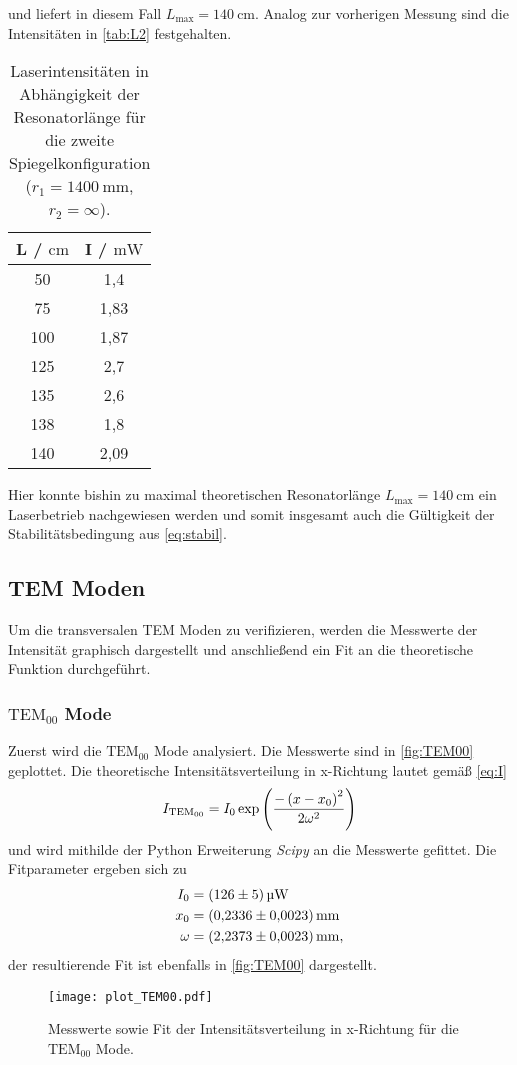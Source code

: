 und liefert in diesem Fall $L_\text{max} = \qty{140}{\centi\metre}$.
Analog zur vorherigen Messung sind die Intensitäten in \autoref{tab:L2} festgehalten.
\begin{table}[H]
  \centering
  \begin{tabular}{c|c}
    {L / $\unit{\centi\metre}$} & {I / $\unit{\milli\watt}$} \\
    \hline
    50  & 1,4  \\
    75  & 1,83  \\
    100  & 1,87  \\
    125  & 2,7  \\
    135  & 2,6  \\
    138  & 1,8  \\
    140  & 2,09  \\
  \end{tabular}
  \caption{Laserintensitäten in Abhängigkeit der Resonatorlänge für die zweite Spiegelkonfiguration ($r_1=\qty{1400}{\milli\metre}$, $r_2 = \infty$).}
  \label{tab:L2}
\end{table}
Hier konnte bishin zu maximal theoretischen Resonatorlänge $L_\text{max} = \qty{140}{\centi\metre}$ ein Laserbetrieb nachgewiesen werden und
somit insgesamt auch die Gültigkeit der Stabilitätsbedingung aus \eqref{eq:stabil}.

\subsection{TEM Moden}
Um die transversalen TEM Moden zu verifizieren, werden die Messwerte der Intensität graphisch dargestellt und anschließend ein Fit an die theoretische
Funktion durchgeführt.
\subsubsection{$\text{TEM}_{00}$ Mode}
Zuerst wird die $\text{TEM}_{00}$ Mode analysiert. Die Messwerte sind in \autoref{fig:TEM00} geplottet.
Die theoretische Intensitätsverteilung in x-Richtung lautet gemäß \eqref{eq:I}
\begin{equation}
  \notag
  I_{\text{TEM}_{00}} = I_0 \exp \left( \frac{-\left(x - x_0\right)^2}{2\omega^2} \right)
\end{equation}
und wird mithilde der Python Erweiterung \textit{Scipy} \cite{scipy} an die Messwerte gefittet.
Die Fitparameter ergeben sich zu
\begin{align*}
  I_0 &=\qty{126+-5}{\micro\watt} \\
  x_0 &=\qty{0.2336+-0.0023}{\milli\metre}   \\
 \omega &=\qty{2.2373+-0.0023}{\milli\metre},
\end{align*}
der resultierende Fit ist ebenfalls in \autoref{fig:TEM00} dargestellt.
\begin{figure}[H]
  \centering
  \texttt{[image: plot\_TEM00.pdf]}
  \caption{Messwerte sowie Fit der Intensitätsverteilung in x-Richtung für die $\text{TEM}_{00}$ Mode.}
  \label{fig:TEM00}
\end{figure}
